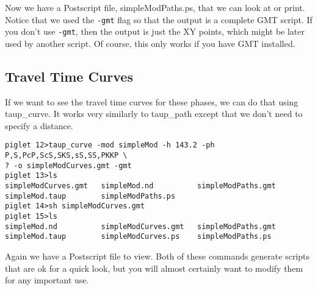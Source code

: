 Now we have a Postscript file, simpleModPaths.ps, that we can look at or print.
Notice that we used the \texttt{-gmt} flag so that the output is a complete 
GMT script. If you don't use \texttt{-gmt}, then the output is just the XY 
points, which might be later used by another script.
Of course, this only works if you have GMT installed.

\subsection{Travel Time Curves}

If we want to see the travel time curves for these phases, we can do that using
taup\_curve. It works very similarly to taup\_path except that we don't need to
specify a distance.

\begin{verbatim}
piglet 12>taup_curve -mod simpleMod -h 143.2 -ph P,S,PcP,ScS,SKS,sS,SS,PKKP \
? -o simpleModCurves.gmt -gmt
piglet 13>ls
simpleModCurves.gmt   simpleMod.nd          simpleModPaths.gmt
simpleMod.taup        simpleModPaths.ps
piglet 14>sh simpleModCurves.gmt
piglet 15>ls
simpleMod.nd          simpleModCurves.gmt   simpleModPaths.gmt
simpleMod.taup        simpleModCurves.ps    simpleModPaths.ps
\end{verbatim}

Again we have a Postscript file to view. Both of these commands generate scripts
that are ok for a quick look, but you will almost certainly want to modify
them for any important use.
